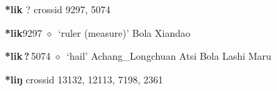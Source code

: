 \item
\textbf{*lik}
?
  {\tiny crossid 9297, 5074}
  \begin{list}{}{\leftmargin=1.5em \itemindent=-1.5em}
  \item {\footnotesize \textbf{*lik}}{\tiny 9297}
         $\diamond$~`ruler (measure)'
         Bola 
\hspace{1ex}
         Xiandao 
  \item {\footnotesize \textbf{*lik\,?\,}}{\tiny 5074}
\hspace{1ex}
         $\diamond$~`hail'
         Achang\_Longchuan 
\hspace{1ex}
         Atsi 
\hspace{1ex}
         Bola 
\hspace{1ex}
         Lashi 
\hspace{1ex}
         Maru 
  \end{list}
\item
\textbf{*liŋ}
  {\tiny crossid 13132, 12113, 7198, 2361}
